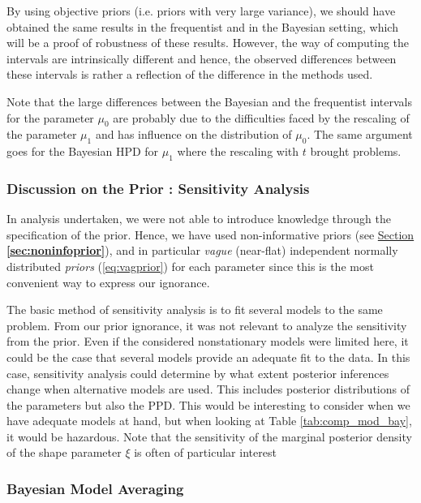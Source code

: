 By using objective priors (i.e. priors with very large variance), we should have obtained the same results in the frequentist and in the Bayesian setting, which will be a proof of robustness of these results. However, the way of computing the intervals are intrinsically different and hence, the observed differences between these intervals is rather a reflection of the difference in the methods used.

Note that the large differences between the Bayesian and the frequentist intervals for the parameter $\mu_0$ are probably due to the difficulties faced by the rescaling of the parameter $\mu_1$ and has influence on the distribution of $\mu_0$. The same argument goes for the Bayesian HPD for $\mu_1$ where the rescaling with $t$ brought problems.


\subsubsection*{Discussion on the Prior : Sensitivity Analysis}

In  analysis undertaken, we were not able to introduce knowledge through the specification of the prior. Hence, we have used non-informative priors (see \hyperref[sec:noninfoprior]{Section \textbf{\ref{sec:noninfoprior}}}), and in particular \emph{vague} (near-flat) independent normally distributed \emph{priors} (\ref{eq:vagprior}) for each parameter since this is the most convenient way to express our ignorance.

The basic method of sensitivity analysis is to fit several models to the same problem. From our prior ignorance, it was not relevant to analyze the sensitivity from the prior. 
Even if the considered nonstationary models were limited here, it could be the case that several models provide an adequate fit to the data. In this case, sensitivity analysis could determine by what extent posterior inferences change when alternative models are used.
This includes posterior distributions of the parameters but also the PPD. This would be interesting to consider when we have adequate models at hand, but when looking at Table \ref{tab:comp_mod_bay}, it would be hazardous. 
Note that the sensitivity of the marginal posterior density of the shape parameter $\xi$ is often of particular interest


\subsubsection*{Bayesian Model Averaging}\label{sec:bmaxp}

